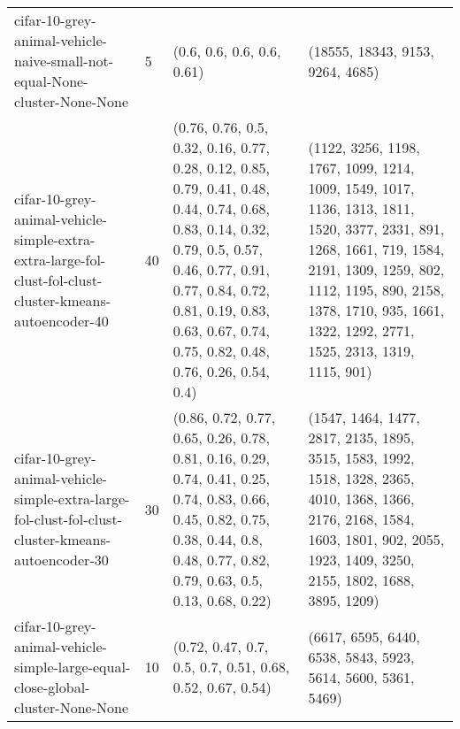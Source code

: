 \begin{longtable}{llll}
                                    cifar-10-grey-animal-vehicle-naive-small-not-equal-None-cluster-None-None &              5 &                                                                                                                                                                                                                                                                                (0.6, 0.6, 0.6, 0.6, 0.61) &                                                                                                                                                                                                                                                                          (18555, 18343, 9153, 9264, 4685) \\
      cifar-10-grey-animal-vehicle-simple-extra-extra-large-fol-clust-fol-clust-cluster-kmeans-autoencoder-40 &             40 &                                                             (0.76, 0.76, 0.5, 0.32, 0.16, 0.77, 0.28, 0.12, 0.85, 0.79, 0.41, 0.48, 0.44, 0.74, 0.68, 0.83, 0.14, 0.32, 0.79, 0.5, 0.57, 0.46, 0.77, 0.91, 0.77, 0.84, 0.72, 0.81, 0.19, 0.83, 0.63, 0.67, 0.74, 0.75, 0.82, 0.48, 0.76, 0.26, 0.54, 0.4) &                                                                (1122, 3256, 1198, 1767, 1099, 1214, 1009, 1549, 1017, 1136, 1313, 1811, 1520, 3377, 2331, 891, 1268, 1661, 719, 1584, 2191, 1309, 1259, 802, 1112, 1195, 890, 2158, 1378, 1710, 935, 1661, 1322, 1292, 2771, 1525, 2313, 1319, 1115, 901) \\
            cifar-10-grey-animal-vehicle-simple-extra-large-fol-clust-fol-clust-cluster-kmeans-autoencoder-30 &             30 &                                                                                                                        (0.86, 0.72, 0.77, 0.65, 0.26, 0.78, 0.81, 0.16, 0.29, 0.74, 0.41, 0.25, 0.74, 0.83, 0.66, 0.45, 0.82, 0.75, 0.38, 0.44, 0.8, 0.48, 0.77, 0.82, 0.79, 0.63, 0.5, 0.13, 0.68, 0.22) &                                                                                                                       (1547, 1464, 1477, 2817, 2135, 1895, 3515, 1583, 1992, 1518, 1328, 2365, 4010, 1368, 1366, 2176, 2168, 1584, 1603, 1801, 902, 2055, 1923, 1409, 3250, 2155, 1802, 1688, 3895, 1209) \\
                               cifar-10-grey-animal-vehicle-simple-large-equal-close-global-cluster-None-None &             10 &                                                                                                                                                                                                                                                 (0.72, 0.47, 0.7, 0.5, 0.7, 0.51, 0.68, 0.52, 0.67, 0.54) &                                                                                                                                                                                                                                              (6617, 6595, 6440, 6538, 5843, 5923, 5614, 5600, 5361, 5469) \\

\end{longtable}
